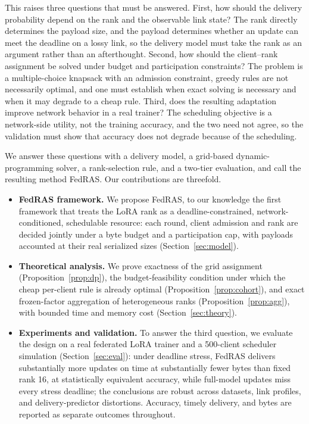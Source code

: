 \documentclass[a4paper,fleqn]{cas-dc}
\begin{document}
This raises three questions that must be answered. First, how should the delivery probability depend on the rank and the observable link state? The rank directly determines the payload size, and the payload determines whether an update can meet the deadline on a lossy link, so the delivery model must take the rank as an argument rather than an afterthought. Second, how should the client--rank assignment be solved under budget and participation constraints? The problem is a multiple-choice knapsack with an admission constraint, greedy rules are not necessarily optimal, and one must establish when exact solving is necessary and when it may degrade to a cheap rule. Third, does the resulting adaptation improve network behavior in a real trainer? The scheduling objective is a network-side utility, not the training accuracy, and the two need not agree, so the validation must show that accuracy does not degrade because of the scheduling.

We answer these questions with a delivery model, a grid-based dynamic-programming solver, a rank-selection rule, and a two-tier evaluation, and call the resulting method FedRAS. Our contributions are threefold.

\begin{itemize}
\item \textbf{FedRAS framework.} We propose FedRAS, to our knowledge the first framework that treats the LoRA rank as a deadline-constrained, network-conditioned, schedulable resource: each round, client admission and rank are decided jointly under a byte budget and a participation cap, with payloads accounted at their real serialized sizes (Section~\ref{sec:model}).
\item \textbf{Theoretical analysis.} We prove exactness of the grid assignment (Proposition~\ref{prop:dp}), the budget-feasibility condition under which the cheap per-client rule is already optimal (Proposition~\ref{prop:cohort}), and exact frozen-factor aggregation of heterogeneous ranks (Proposition~\ref{prop:agg}), with bounded time and memory cost (Section~\ref{sec:theory}).
\item \textbf{Experiments and validation.} To answer the third question, we evaluate the design on a real federated LoRA trainer and a 500-client scheduler simulation (Section~\ref{sec:eval}): under deadline stress, FedRAS delivers substantially more updates on time at substantially fewer bytes than fixed rank 16, at statistically equivalent accuracy, while full-model updates miss every stress deadline; the conclusions are robust across datasets, link profiles, and delivery-predictor distortions. Accuracy, timely delivery, and bytes are reported as separate outcomes throughout.
\end{itemize}
\end{document}
